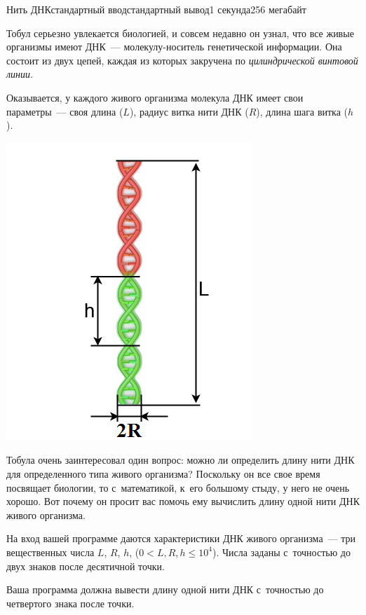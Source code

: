 \begin{problem}{Нить ДНК}{стандартный ввод}{стандартный вывод}{1 секунда}{256 мегабайт}

Тобул серьезно увлекается биологией, и совсем недавно он узнал, что все живые организмы имеют ДНК~--- молекулу-носитель генетической информации. Она состоит из двух цепей, каждая из которых закручена по \textit{цилиндрической винтовой линии}. 

Оказывается, у каждого живого организма молекула ДНК имеет свои параметры~--- своя длина ($L$), радиус витка нити ДНК ($R$), длина шага витка ($h$).

\begin{center}
\includegraphics[scale=0.4]{dna.png}
\end{center}

Тобула очень заинтересовал один вопрос: можно ли определить длину нити ДНК для определенного типа живого организма? Поскольку он все свое время посвящает биологии, то с~математикой, к~его большому стыду, у него не очень хорошо. Вот почему он просит вас помочь ему вычислить длину одной нити ДНК живого организма.

\InputFile
На вход вашей программе даются характеристики ДНК живого организма~--- три вещественных числа $L$, $R$, $h$, ($0< L, R, h \le 10^4$). Числа заданы с~точностью до двух знаков после десятичной точки.

\OutputFile
Ваша программа должна вывести длину одной нити ДНК с~точностью до четвертого знака после точки.


\end{problem}
